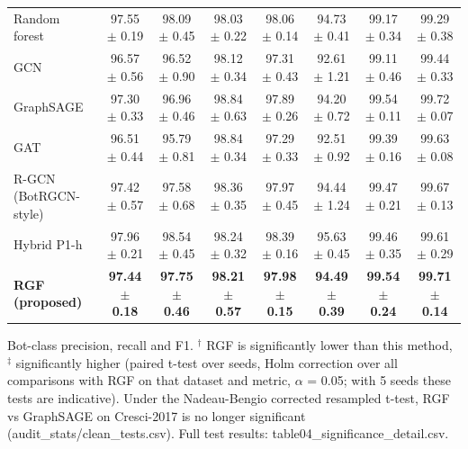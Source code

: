 \begin{table}[!t]
\begin{tabular}{lccccccc}
Random forest & 97.55 $\pm$ 0.19 & 98.09 $\pm$ 0.45 & 98.03 $\pm$ 0.22 & 98.06 $\pm$ 0.14 & 94.73 $\pm$ 0.41 & 99.17 $\pm$ 0.34 & 99.29 $\pm$ 0.38 \\
GCN & 96.57 $\pm$ 0.56 & 96.52 $\pm$ 0.90 & 98.12 $\pm$ 0.34 & 97.31 $\pm$ 0.43 & 92.61 $\pm$ 1.21 & 99.11 $\pm$ 0.46 & 99.44 $\pm$ 0.33 \\
GraphSAGE & 97.30 $\pm$ 0.33 & 96.96 $\pm$ 0.46 & 98.84 $\pm$ 0.63 & 97.89 $\pm$ 0.26 & 94.20 $\pm$ 0.72 & 99.54 $\pm$ 0.11 & 99.72 $\pm$ 0.07 \\
GAT & 96.51 $\pm$ 0.44 & 95.79 $\pm$ 0.81 & 98.84 $\pm$ 0.34 & 97.29 $\pm$ 0.33 & 92.51 $\pm$ 0.92 & 99.39 $\pm$ 0.16 & 99.63 $\pm$ 0.08 \\
R-GCN (BotRGCN-style) & 97.42 $\pm$ 0.57 & 97.58 $\pm$ 0.68 & 98.36 $\pm$ 0.35 & 97.97 $\pm$ 0.45 & 94.44 $\pm$ 1.24 & 99.47 $\pm$ 0.21 & 99.67 $\pm$ 0.13 \\
Hybrid P1-h & 97.96 $\pm$ 0.21 & 98.54 $\pm$ 0.45 & 98.24 $\pm$ 0.32 & 98.39 $\pm$ 0.16 & 95.63 $\pm$ 0.45 & 99.46 $\pm$ 0.35 & 99.61 $\pm$ 0.29 \\
\textbf{RGF (proposed)} & \textbf{97.44 $\pm$ 0.18} & \textbf{97.75 $\pm$ 0.46} & \textbf{98.21 $\pm$ 0.57} & \textbf{97.98 $\pm$ 0.15} & \textbf{94.49 $\pm$ 0.39} & \textbf{99.54 $\pm$ 0.24} & \textbf{99.71 $\pm$ 0.14} \\
\hline
\end{tabular}
\par\smallskip\parbox{\linewidth}{\scriptsize Bot-class precision, recall and F1. $^\dagger$ RGF is significantly lower than this method, $^\ddagger$ significantly higher (paired t-test over seeds, Holm correction over all comparisons with RGF on that dataset and metric, $\alpha$ = 0.05; with 5 seeds these tests are indicative). Under the Nadeau-Bengio corrected resampled t-test, RGF vs GraphSAGE on Cresci-2017 is no longer significant (audit\_stats/clean\_tests.csv). Full test results: table04\_significance\_detail.csv.}
\end{table}

